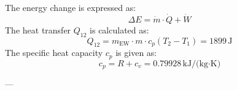 The energy change is expressed as:  
\[
\Delta E = \dot{m} \cdot \dot{Q} + \dot{W}
\]  
The heat transfer \( Q_{12} \) is calculated as:  
\[
Q_{12} = m_{\text{EW}} \cdot m \cdot c_p (T_2 - T_1) = 1899 \, \text{J}
\]  
The specific heat capacity \( c_p \) is given as:  
\[
c_p = R + c_v = 0.79928 \, \text{kJ/(kg·K)}
\]  

---